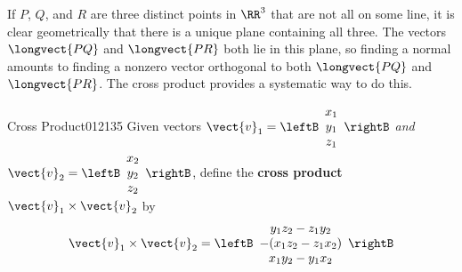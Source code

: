 If $P$, $Q$, and $R$ are three distinct points in $\RR^3$ that are not all on some line, it is clear geometrically that there is a unique plane containing all three. The vectors $\longvect{PQ}$ and $\longvect{PR}$ both lie in this plane, so finding a normal amounts to finding a nonzero vector orthogonal to both $\longvect{PQ}$ and $\longvect{PR}$. The cross product provides a systematic way to do this.


\begin{definition}{Cross Product}{012135}
Given vectors $\vect{v}_{1}= \leftB
\begin{array}{c}
x_{1}\\
y_{1} \\
z_{1}
\end{array}
\rightB$
 \textit{and} 
$\vect{v}_{2}= \leftB
\begin{array}{c}
x_{2}\\
y_{2} \\
z_{2}
\end{array}
\rightB$, define the \textbf{cross product} $\vect{v}_{1} \times \vect{v}_{2}$ by
\begin{equation*}
\vect{v}_{1} \times \vect{v}_{2} = \leftB
\begin{array}{c}
y_{1}z_{2} - z_{1}y_{2}\\
-(x_{1}z_{2} - z_{1}x_{2}) \\
x_{1}y_{2} - y_{1}x_{2}
\end{array}
\rightB
\end{equation*}
\end{definition}

\begin{wrapfigure}[9]{l}{5cm} 
\centering

\caption{\label{fig:012149}}
\end{wrapfigure}

